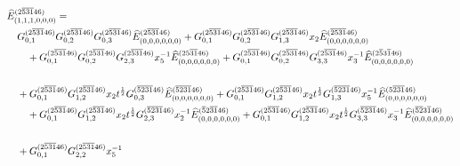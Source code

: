 \documentclass[11pt]{article}
\theoremstyle{plain}
\theoremstyle{definition}
\theoremstyle{remark}
\numberwithin{equation}{section}
\newcounter{r}
\newcounter{s}
\begin{document}
\begin{align*}\widehat{E}^{(2\overline{5}\overline{3}\overline{1}46)}_{(1,1,1,0,0,0)} =\hspace{-5em}&
\\
&G_{0,1}^{(2\overline{5}\overline{3}\overline{1}46)}
G_{0,2}^{(2\overline{5}\overline{3}\overline{1}46)}
G_{0,3}^{(2\overline{5}\overline{3}\overline{1}46)} 
\widehat{E}^{(2\overline{5}\overline{3}\overline{1}46)}_{(0,0,0,0,0,0)}
+G_{0,1}^{(2\overline{5}\overline{3}\overline{1}46)}
G_{0,2}^{(2\overline{5}\overline{3}\overline{1}46)}
G_{1,3}^{(2\overline{5}\overline{3}\overline{1}46)} x_2 
\widehat{E}^{(\overline{2}\overline{5}\overline{3}\overline{1}46)}_{(0,0,0,0,0,0)}
\\
&\quad+G_{0,1}^{(2\overline{5}\overline{3}\overline{1}46)}
G_{0,2}^{(2\overline{5}\overline{3}\overline{1}46)}
G_{2,3}^{(2\overline{5}\overline{3}\overline{1}46)} x_5^{-1}  
\widehat{E}^{(25\overline{3}\overline{1}46)}_{(0,0,0,0,0,0)}
+G_{0,1}^{(2\overline{5}\overline{3}\overline{1}46)}
G_{0,2}^{(2\overline{5}\overline{3}\overline{1}46)}
G_{3,3}^{(2\overline{5}\overline{3}\overline{1}46)} x_3^{-1} 
\widehat{E}^{(2\overline{5}3\overline{1}46)}_{(0,0,0,0,0,0)}
\\
\\
&+G_{0,1}^{(2\overline{5}\overline{3}\overline{1}46)}
G_{1,2}^{(2\overline{5}\overline{3}\overline{1}46)} x_2t^{\frac12}
G_{0,3}^{(\overline{5}\overline{2}\overline{3}\overline{1}46)} 
\widehat{E}^{(\overline{5}\overline{2}\overline{3}\overline{1}46)}_{(0,0,0,0,0,0)}
+G_{0,1}^{(2\overline{5}\overline{3}\overline{1}46)}
G_{1,2}^{(2\overline{5}\overline{3}\overline{1}46)} x_2t^{\frac12}
G_{1,3}^{(\overline{5}\overline{2}\overline{3}\overline{1}46)} x_5^{-1} 
\widehat{E}^{(5\overline{2}\overline{3}\overline{1}46)}_{(0,0,0,0,0,0)}
\\
&\quad+G_{0,1}^{(2\overline{5}\overline{3}\overline{1}46)}
G_{1,2}^{(2\overline{5}\overline{3}\overline{1}46)} x_2t^{\frac12}
G_{2,3}^{(\overline{5}\overline{2}\overline{3}\overline{1}46)} x_2^{-1} 
\widehat{E}^{(\overline{5}2\overline{3}\overline{1}46)}_{(0,0,0,0,0,0)}
+G_{0,1}^{(2\overline{5}\overline{3}\overline{1}46)}
G_{1,2}^{(2\overline{5}\overline{3}\overline{1}46)} x_2t^{\frac12}
G_{3,3}^{(\overline{5}\overline{2}\overline{3}\overline{1}46)} x_3^{-1} 
\widehat{E}^{(\overline{5}\overline{2}3\overline{1}46)}_{(0,0,0,0,0,0)}
\\
\\
&+G_{0,1}^{(2\overline{5}\overline{3}\overline{1}46)}
G_{2,2}^{(2\overline{5}\overline{3}\overline{1}46)}x_5^{-1}

\end{align*}
\end{document}
